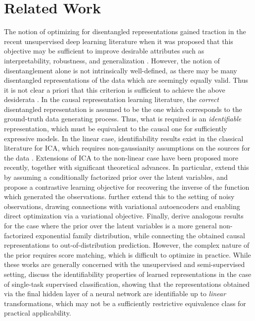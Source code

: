 \documentclass[nohyperref]{article}
\theoremstyle{plain}
\theoremstyle{definition}
\theoremstyle{remark}
\begin{document}
\section{Related Work}

The notion of optimizing for disentangled representations gained traction in the recent unsupervised deep learning literature when it was proposed that this 
objective may be sufficient to improve desirable attributes such as interpretability, robustness, and generalization \citep{Higgins_Matthey_Pal_Burgess_Glorot_Botvinick_Mohamed_Lerchner_2017,chen2016infogan}. However, 
the notion of disentanglement alone is not intrinsically well-defined, as there may be many disentangled representations of the data which are seemingly equally valid. Thus it is not clear a priori that this criterion is sufficient to
achieve the above desiderata \citep{Locatello_Bauer_Lucic_Raetsch_Gelly_Scholkopf_Bachem_2019}. In the causal representation learning literature, the \textit{correct} disentangled representation is assumed to be the one 
which corresponds to the ground-truth data generating process. Thus, what is required is an \textit{identifiable} representation, which must be equivalent to the causal one for sufficiently expressive models. In the linear case, identifiability results exist 
in the classical literature for ICA, which requires non-gaussianity assumptions on the sources for the data \citep{Herault_Jutten_1986,Comon_1994}. Extensions of ICA to the non-linear case have been proposed more recently, together with significant theoretical advances. In particular, \citet{hyvarinen2019nonlinear} extend this by assuming a conditionally factorized prior over the latent variables, and propose a contrastive learning objective for recovering the inverse of the function which generated the observations.
\citet{Khemakhem_Kingma_Monti_Hyvarinen_2020} further extend this to the setting of noisy observations, drawing connections with variational autoencoders \citep{kingma2013auto} and enabling direct optimization via a variational objective. Finally, \citet{Lu_Wu_Hernandez-Lobato_Scholkopf_2022}
derive analogous results for the case where the prior over the latent variables is a more general non-factorized exponential family distribution, while connecting the obtained causal representations to out-of-distribution prediction. However,
the complex nature of the prior requires score matching, which is difficult to optimize in practice.
While these works are generally concerned with the unsupervised and semi-supervised setting, \citet{Roeder_Metz_Kingma_2021} discuss the identifiability properties of learned representations in the case of single-task supervised classification, showing 
that the representations obtained via the final hidden layer of a neural network are identifiable up to \textit{linear} transformations, which may not be a sufficiently restrictive equivalence class for practical applicability.
\end{document}
